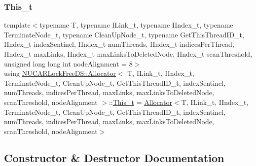 \subsubsection{\texorpdfstring{This\+\_\+t}{This\_t}}
{\footnotesize\ttfamily template$<$typename T, typename I\+Link\+\_\+t, typename I\+Index\+\_\+t, typename Terminate\+Node\+\_\+t, typename Clean\+Up\+Node\+\_\+t, typename Get\+This\+Thread\+I\+D\+\_\+t, I\+Index\+\_\+t index\+Sentinel, I\+Index\+\_\+t num\+Threads, I\+Index\+\_\+t indices\+Per\+Thread, I\+Index\+\_\+t max\+Links, I\+Index\+\_\+t max\+Links\+To\+Deleted\+Node, I\+Index\+\_\+t scan\+Threshold, unsigned long long int node\+Alignment = 8$>$ \\
using \mbox{\hyperlink{class_n_u_c_a_r_lock_free_d_s_1_1_allocator}{N\+U\+C\+A\+R\+Lock\+Free\+D\+S\+::\+Allocator}}$<$ T, I\+Link\+\_\+t, I\+Index\+\_\+t, Terminate\+Node\+\_\+t, Clean\+Up\+Node\+\_\+t, Get\+This\+Thread\+I\+D\+\_\+t, index\+Sentinel, num\+Threads, indices\+Per\+Thread, max\+Links, max\+Links\+To\+Deleted\+Node, scan\+Threshold, node\+Alignment $>$\+::\mbox{\hyperlink{class_n_u_c_a_r_lock_free_d_s_1_1_allocator_aa7636b4884545094b9532cc295604b17}{This\+\_\+t}} =  \mbox{\hyperlink{class_n_u_c_a_r_lock_free_d_s_1_1_allocator}{Allocator}}$<$T, I\+Link\+\_\+t, I\+Index\+\_\+t, Terminate\+Node\+\_\+t, Clean\+Up\+Node\+\_\+t, Get\+This\+Thread\+I\+D\+\_\+t, index\+Sentinel, num\+Threads, indices\+Per\+Thread, max\+Links, max\+Links\+To\+Deleted\+Node, scan\+Threshold, node\+Alignment$>$}



\subsection{Constructor \& Destructor Documentation}
\mbox{\label{class_n_u_c_a_r_lock_free_d_s_1_1_allocator_adc2d0f788ae4d12cdfb3b2d3e8075c77}} 
